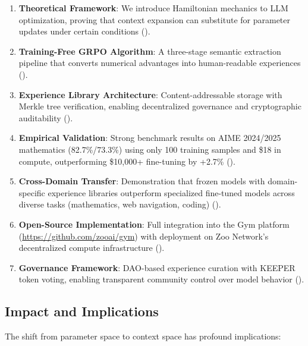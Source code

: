 \begin{enumerate}
    \item \textbf{Theoretical Framework}: We introduce Hamiltonian mechanics to LLM optimization, proving that context expansion can substitute for parameter updates under certain conditions ().

    \item \textbf{Training-Free GRPO Algorithm}: A three-stage semantic extraction pipeline that converts numerical advantages into human-readable experiences ().

    \item \textbf{Experience Library Architecture}: Content-addressable storage with Merkle tree verification, enabling decentralized governance and cryptographic auditability ().

    \item \textbf{Empirical Validation}: Strong benchmark results on AIME 2024/2025 mathematics (82.7\%/73.3\%) using only 100 training samples and \$18 in compute, outperforming \$10,000+ fine-tuning by +2.7\% ().

    \item \textbf{Cross-Domain Transfer}: Demonstration that frozen models with domain-specific experience libraries outperform specialized fine-tuned models across diverse tasks (mathematics, web navigation, coding) ().

    \item \textbf{Open-Source Implementation}: Full integration into the Gym platform (\url{https://github.com/zooai/gym}) with deployment on Zoo Network's decentralized compute infrastructure ().

    \item \textbf{Governance Framework}: DAO-based experience curation with KEEPER token voting, enabling transparent community control over model behavior ().
\end{enumerate}

\subsection{Impact and Implications}

The shift from parameter space to context space has profound implications:

